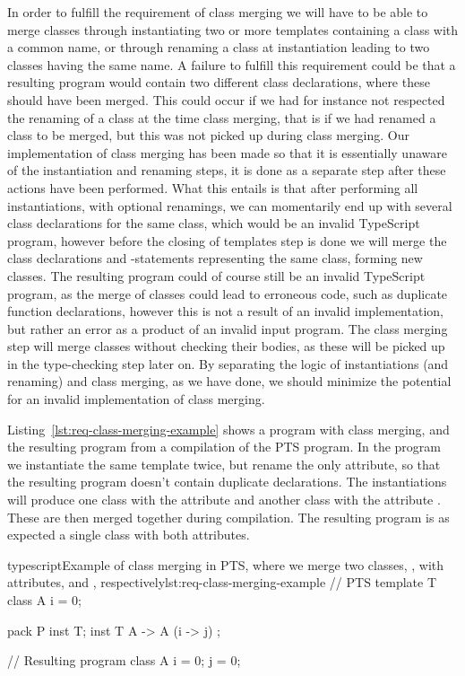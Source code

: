 In order to fulfill the requirement of class merging we will have to be able to merge classes through instantiating two or more templates containing a class with a common name, or through renaming a class at instantiation leading to two classes having the same name.
A failure to fulfill this requirement could be that a resulting program would contain two different class declarations, where these should have been merged.
This could occur if we had for instance not respected the renaming of a class at the time class merging, that is if we had renamed a class to be merged, but this was not picked up during class merging.
Our implementation of class merging has been made so that it is essentially unaware of the instantiation and renaming steps, it is done as a separate step after these actions have been performed.
What this entails is that after performing all instantiations, with optional renamings, we can momentarily end up with several class declarations for the same class, which would be an invalid TypeScript program, however before the closing of templates step is done we will merge the class declarations and -statements representing the same class, forming new classes.
The resulting program could of course still be an invalid TypeScript program, as the merge of classes could lead to erroneous code, such as duplicate function declarations, however this is not a result of an invalid implementation, but rather an error as a product of an invalid input program.
The class merging step will merge classes without checking their bodies, as these will be picked up in the type-checking step later on.
By separating the logic of instantiations (and renaming) and class merging, as we have done, we should minimize the potential for an invalid implementation of class merging.

Listing~\vref{lst:req-class-merging-example} shows a program with class merging, and the resulting program from a compilation of the PTS program.
In the program we instantiate the same template twice, but rename the only attribute, so that the resulting program doesn't contain duplicate declarations.
The instantiations will produce one class  with the attribute  and another class  with the attribute .
These are then merged together during compilation.
The resulting program is as expected a single class  with both attributes.

\begin{code}{typescript}{Example of class merging in PTS, where we merge two classes, , with attributes,  and , respectively}{lst:req-class-merging-example}
    // PTS
    template T {
        class A {
            i = 0;
        }
    }

    pack P {
        inst T;
        inst T { A -> A (i -> j) };
    }

    // Resulting program
    class A {
        i = 0;
        j = 0;
    }
\end{code}

